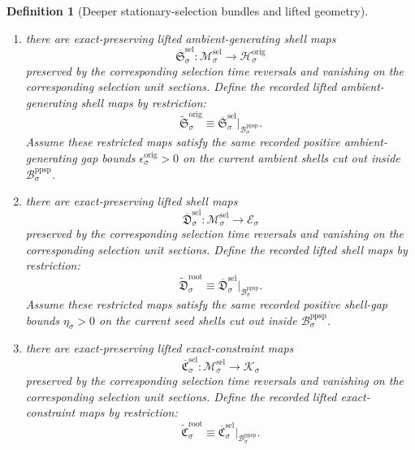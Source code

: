 \documentclass[11pt]{article}
\newcommand{\ShellTarget}[1]{\mathcal E_{#1}}
\newcommand{\ShellGap}[1]{\eta_{#1}}
\newcommand{\ConstraintTarget}[1]{\mathcal K_{#1}}
\newcommand{\OriginTarget}[1]{\mathcal H_{#1}^{\mathrm{orig}}}
\newcommand{\OriginGap}[1]{\epsilon_{#1}^{\mathrm{orig}}}
\newcommand{\RootGap}[1]{\kappa_{#1}^{\mathrm{root}}}
\newcommand{\PreProtoSubprimSpace}[1]{\mathcal B_{#1}^{\mathrm{ppsp}}}
\newcommand{\PreProtoSubprimLiftedAmbient}[1]{\widetilde{\mathfrak S}_{#1}^{\mathrm{orig}}}
\newcommand{\PreProtoSubprimLiftedShell}[1]{\widetilde{\mathfrak D}_{#1}^{\mathrm{root}}}
\newcommand{\PreProtoSubprimConstraintMap}[1]{\widetilde{\mathfrak C}_{#1}^{\mathrm{root}}}
\newcommand{\SelSpace}[1]{\mathcal M_{#1}^{\mathrm{sel}}}
\newcommand{\SelLiftedAmbient}[1]{\overline{\mathfrak S}_{#1}^{\mathrm{sel}}}
\newcommand{\SelLiftedShell}[1]{\overline{\mathfrak D}_{#1}^{\mathrm{sel}}}
\newcommand{\SelConstraintMap}[1]{\overline{\mathfrak C}_{#1}^{\mathrm{sel}}}
\newtheorem{definition}{Definition}
\begin{document}
\begin{definition}[Deeper stationary-selection bundles and lifted geometry]
\begin{enumerate}
\begin{equation}
    \label{eq:preproto_preambient_from_selection}
    \end{equation}
    Assume these restricted maps satisfy the same recorded positive root gap bounds \(\RootGap{\sigma}>0\) on the current pre-ambient shells cut out inside \(\PreProtoSubprimSpace{\sigma}\).
    \item there are exact-preserving lifted ambient-generating shell maps
    \[
    \SelLiftedAmbient{\sigma}:\SelSpace{\sigma}\to\OriginTarget{\sigma}
    \]
    preserved by the corresponding selection time reversals and vanishing on the corresponding selection unit sections. Define the recorded lifted ambient-generating shell maps by restriction:
    \begin{equation}
    \PreProtoSubprimLiftedAmbient{\sigma}\equiv \SelLiftedAmbient{\sigma}|_{\PreProtoSubprimSpace{\sigma}}.
    \label{eq:preproto_ambient_from_selection}
    \end{equation}
    Assume these restricted maps satisfy the same recorded positive ambient-generating gap bounds \(\OriginGap{\sigma}>0\) on the current ambient shells cut out inside \(\PreProtoSubprimSpace{\sigma}\).
    \item there are exact-preserving lifted shell maps
    \[
    \SelLiftedShell{\sigma}:\SelSpace{\sigma}\to\ShellTarget{\sigma}
    \]
    preserved by the corresponding selection time reversals and vanishing on the corresponding selection unit sections. Define the recorded lifted shell maps by restriction:
    \begin{equation}
    \PreProtoSubprimLiftedShell{\sigma}\equiv \SelLiftedShell{\sigma}|_{\PreProtoSubprimSpace{\sigma}}.
    \label{eq:preproto_shell_map_from_selection}
    \end{equation}
    Assume these restricted maps satisfy the same recorded positive shell-gap bounds \(\ShellGap{\sigma}>0\) on the current seed shells cut out inside \(\PreProtoSubprimSpace{\sigma}\).
    \item there are exact-preserving lifted exact-constraint maps
    \[
    \SelConstraintMap{\sigma}:\SelSpace{\sigma}\to\ConstraintTarget{\sigma}
    \]
    preserved by the corresponding selection time reversals and vanishing on the corresponding selection unit sections. Define the recorded lifted exact-constraint maps by restriction:
    \begin{equation}
    \PreProtoSubprimConstraintMap{\sigma}\equiv \SelConstraintMap{\sigma}|_{\PreProtoSubprimSpace{\sigma}}.
    \label{eq:preproto_constraint_from_selection}
    \end{equation}

\end{enumerate}
\end{definition}
\end{document}
